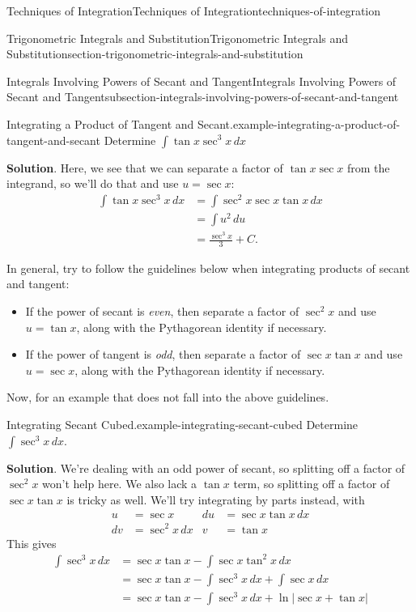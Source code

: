 \documentclass[oneside,10pt,]{book}
\numberwithin{equation}{section}
\begin{document}
\begin{chapterptx}{Techniques of Integration}{}{Techniques of Integration}{}{}{techniques-of-integration}
\begin{sectionptx}{Trigonometric Integrals and Substitution}{}{Trigonometric Integrals and Substitution}{}{}{section-trigonometric-integrals-and-substitution}
\begin{subsectionptx}{Integrals Involving Powers of Secant and Tangent}{}{Integrals Involving Powers of Secant and Tangent}{}{}{subsection-integrals-involving-powers-of-secant-and-tangent}
\begin{example}{Integrating a Product of Tangent and Secant.}{example-integrating-a-product-of-tangent-and-secant}
\hypertarget{p-535}{}%
Determine \(\int\tan x\sec^{3} x\,dx\)%
\par\smallskip%
\noindent\textbf{Solution}.\hypertarget{solution-118}{}\quad%
\hypertarget{p-536}{}%
Here, we see that we can separate a factor of \(\tan x\sec x\) from the integrand, so we'll do that and use \(u = \sec x\):%
%
\begin{align*}
\int\tan x\sec^{3}x\,dx & = \int \sec^{2}x \sec x\tan x\,dx \\
& = \int u^{2}\,du \\
& = \frac{\sec^{3}x}{3} + C. 
\end{align*}
\end{example}
\hypertarget{p-537}{}%
In general, try to follow the guidelines below when integrating products of secant and tangent:\leavevmode%
\begin{itemize}[label=\textbullet]
\item{}If the power of secant is \emph{even}, then separate a factor of \(\sec^{2}x\) and use \(u = \tan x\), along with the Pythagorean identity if necessary.%
\item{}If the power of tangent is \emph{odd}, then separate a factor of \(\sec x\tan x\) and use \(u = \sec x\), along with the Pythagorean identity if necessary.%
\end{itemize}
%
\par
\hypertarget{p-538}{}%
Now, for an example that does not fall into the above guidelines.%
\begin{example}{Integrating Secant Cubed.}{example-integrating-secant-cubed}%
\hypertarget{p-539}{}%
Determine \(\int\sec^{3}x\,dx\).%
\par\smallskip%
\noindent\textbf{Solution}.\hypertarget{solution-119}{}\quad%
\hypertarget{p-540}{}%
We're dealing with an odd power of secant, so splitting off a factor of \(\sec^{2}x\) won't help here. We also lack a \(\tan x\) term, so splitting off a factor of \(\sec x\tan x\) is tricky as well. We'll try integrating by parts instead, with%
\begin{align*}
u & = \sec x & du & = \sec x\tan x\,dx\\
dv & = \sec^{2}x\,dx & v & = \tan x 
\end{align*}
This gives%
%
\begin{align*}
\int\sec^{3}x\,dx & = \sec x\tan x - \int \sec x\tan^{2}x\,dx \\
& = \sec x\tan x - \int\sec^{3}x\,dx + \int\sec x\,dx \\
& = \sec x\tan x - \int\sec^{3}x\,dx + \ln|\sec x + \tan x| 

\end{align*}
\end{example}
\end{subsectionptx}
\end{sectionptx}
\end{chapterptx}
\end{document}
